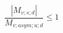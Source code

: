 \documentclass[12pt]{article}
\begin{document}
\begin{displaymath}
\frac {|M_{v;s;d}|} {M_{v;asym;u;d}} \leq 1
\end{displaymath}
\end{document}
